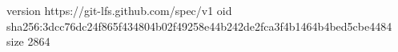 version https://git-lfs.github.com/spec/v1
oid sha256:3dcc76dc24f865f434804b02f49258e44b242de2fca3f4b1464b4bed5cbe4484
size 2864
